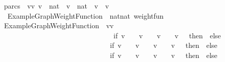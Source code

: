 \begin{isabellebody}
parcs\ {\isacharequal}\ {\isacharbraceleft}{\isacharparenleft}vv\ v\ {\isasymin}\ {\isacharbraceleft}{}{\isacharcomma}{}{\isacharcomma}{}{\isacharcomma}{\isacharparenleft}{}{\isacharcolon}{\isacharcolon}nat{\isacharparenright}{\isacharbraceright}\ {\isasymand}\ v\ {\isasymin}\ {\isacharbraceleft}{}{\isacharcomma}{}{\isacharcomma}{}{\isacharcomma}{\isacharparenleft}{}{\isacharcolon}{\isacharcolon}nat{\isacharparenright}{\isacharbraceright}\ {\isasymand}\ v\ {\isasymnoteq}\ v\ \isanewline
{\isacharbar}{\isacharparenright}{\isachardoublequoteclose}\ \isanewline
\isanewline
{}\isamarkupfalse%
\ ExampleGraphWeightFunction\ {\isacharcolon}{\isacharcolon}\ {\isachardoublequoteopen}{\isacharparenleft}nat{\isasymtimes}nat{\isacharparenright}\ weight{\isacharunderscore}fun{\isachardoublequoteclose}\ \ \isanewline
{\isachardoublequoteopen}ExampleGraphWeightFunction\ {\isasymequiv}\ {\isacharparenleft}{\isasymlambda}{\isacharparenleft}vv\ \isanewline
\ \ \ \ \ \ \ \ \ \ \ \ \ \ \ \ \ \ \ \ \ \ \ \ \ \ \ \ \ \ \ if\ {\isacharparenleft}v\ {\isacharequal}\ {}\ {\isasymand}\ v\ {\isacharequal}\ {}{\isacharparenright}\ {\isasymor}\ {\isacharparenleft}v\ {\isacharequal}\ {}\ {\isasymand}\ v\ {\isacharequal}\ {}{\isacharparenright}\ then\ {}\ else\isanewline
\ \ \ \ \ \ \ \ \ \ \ \ \ \ \ \ \ \ \ \ \ \ \ \ \ \ \ \ \ \ {\isacharparenleft}if\ {\isacharparenleft}v\ {\isacharequal}\ {}\ {\isasymand}\ v\ {\isacharequal}\ {}{\isacharparenright}\ {\isasymor}\ {\isacharparenleft}v\ {\isacharequal}\ {}\ {\isasymand}\ v\ {\isacharequal}\ {}{\isacharparenright}\ then\ {}\ else\isanewline
\ \ \ \ \ \ \ \ \ \ \ \ \ \ \ \ \ \ \ \ \ \ \ \ \ \ \ \ \ \ {\isacharparenleft}if\ {\isacharparenleft}v\ {\isacharequal}\ {}\ {\isasymand}\ v\ {\isacharequal}\ {}{\isacharparenright}\ {\isasymor}\ {\isacharparenleft}v\ {\isacharequal}\ {}\ {\isasymand}\ v\ {\isacharequal}\ {}{\isacharparenright}\ then\ {}\ else\isanewline

\end{isabellebody}
